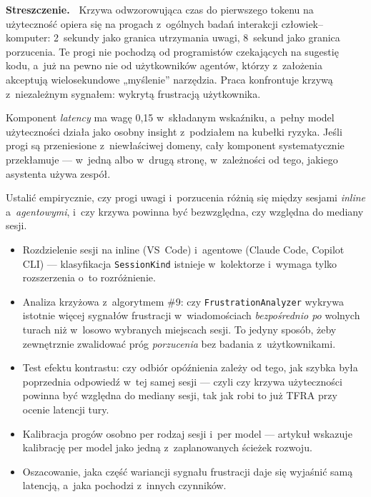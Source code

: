 \documentclass[11pt,a4paper]{article}
\newcommand{\blok}[1]{\vspace{0.2em}\noindent{\bfseries\color{csblue}#1}\par\nopagebreak}
\newenvironment{streszczenie}%
  {\vspace{-0.7em}\begin{shaded}\noindent\textbf{Streszczenie.\ }}%
  {\end{shaded}\vspace{-0.5em}}
\begin{document}
\begin{streszczenie}
Krzywa odwzorowująca czas do pierwszego tokenu na użyteczność opiera się na
progach z~ogólnych badań interakcji człowiek--komputer: 2~sekundy jako granica
utrzymania uwagi, 8~sekund jako granica porzucenia. Te progi nie pochodzą od
programistów czekających na sugestię kodu, a~już na pewno nie od użytkowników
agentów, którzy z~założenia akceptują wielosekundowe „myślenie'' narzędzia.
Praca konfrontuje krzywą z~niezależnym sygnałem: wykrytą frustracją użytkownika.
\end{streszczenie}

\blok{Kontekst i motywacja}
Komponent \emph{latency} ma wagę 0{,}15 w~składanym wskaźniku, a~pełny model
użyteczności działa jako osobny insight z~podziałem na kubełki ryzyka. Jeśli
progi są przeniesione z~niewłaściwej domeny, cały komponent systematycznie
przekłamuje --- w~jedną albo w~drugą stronę, w~zależności od tego, jakiego
asystenta używa zespół.

\blok{Cel pracy}
Ustalić empirycznie, czy progi uwagi i~porzucenia różnią się między sesjami
\emph{inline} a~\emph{agentowymi}, i~czy krzywa powinna być bezwzględna, czy
względna do mediany sesji.

\blok{Zakres prac}
\begin{itemize}
  \item Rozdzielenie sesji na inline (VS~Code) i~agentowe (Claude Code,
        Copilot CLI) --- klasyfikacja \texttt{SessionKind} istnieje w~kolektorze
        i~wymaga tylko rozszerzenia o~to rozróżnienie.
  \item Analiza krzyżowa z~algorytmem \#9: czy \texttt{FrustrationAnalyzer}
        wykrywa istotnie więcej sygnałów frustracji w~wiadomościach
        \emph{bezpośrednio po} wolnych turach niż w~losowo wybranych miejscach
        sesji. To jedyny sposób, żeby zewnętrznie zwalidować próg
        \emph{porzucenia} bez badania z~użytkownikami.
  \item Test efektu kontrastu: czy odbiór opóźnienia zależy od tego, jak szybka
        była poprzednia odpowiedź w~tej samej sesji --- czyli czy krzywa
        użyteczności powinna być względna do mediany sesji, tak jak robi to już
        TFRA przy ocenie latencji tury.
  \item Kalibracja progów osobno per rodzaj sesji i~per model --- artykuł
        wskazuje kalibrację per model jako jedną z~zaplanowanych ścieżek rozwoju.
  \item Oszacowanie, jaka część wariancji sygnału frustracji daje się wyjaśnić
        samą latencją, a~jaka pochodzi z~innych czynników.
\end{itemize}
\end{document}
